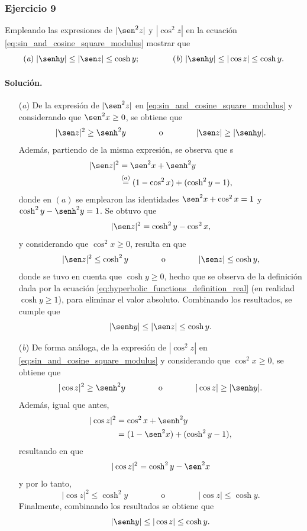 \documentclass[a4paper]{report}
\begin{document}
\subsubsection{Ejercicio 9}

Empleando las expresiones de \(|\sen^2z|\) y \(|\cos^2z|\) en la ecuación \ref{eq:sin_and_cosine_square_modulus} mostrar que 
\[
 (\textit{a})\;|\senh y|\leq|\sen z|\leq\cosh y;\qquad\qquad (\textit{b})\;|\senh y|\leq|\cos z|\leq\cosh y.
\]

\paragraph{Solución.} 
\begin{enumerate}
 \item[(\textit{a})] De la expresión de \(|\sen^2z|\) en \ref{eq:sin_and_cosine_square_modulus} y considerando que \(\sen^2x\geq 0\), se obtiene que 
 \[
  |\sen z|^2\geq\senh^2y
  \qquad\qquad\textrm{o}\qquad\qquad
  |\sen z|\geq|\senh y|.
 \]
 Además, partiendo de la misma expresión, se observa que s 
 \begin{align*}
  |\sen z|^2&=\sen^2x+\senh^2y\\
   &\overset{(a)}{=}(1-\cos^2x)+(\cosh^2y-1),
 \end{align*}
 donde en \((a)\) se emplearon las identidades \(\sen^2x+\cos^2x=1\) y \(\cosh^2y-\senh^2y=1\). Se obtuvo que  
 \begin{equation}\label{eq:sin_and_cosine_square_modulus_alt_sin}
  |\sen z|^2=\cosh^2y-\cos^2x,  
 \end{equation}
 y considerando que \(\cos^2x\geq0\), resulta en que 
 \[
  |\sen z|^2\leq\cosh^2y
  \qquad\qquad\textrm{o}\qquad\qquad
  |\sen z|\leq\cosh y,
 \]
 donde se tuvo en cuenta que \(\cosh y\geq0\), hecho que se observa de la definición dada por la ecuación \ref{eq:hyperbolic_functions_definition_real} (en realidad \(\cosh y\geq1\)), para eliminar el valor absoluto. Combinando los resultados, se cumple que 
 \[
  |\senh y|\leq|\sen z|\leq\cosh y.
 \]
 \item[(\textit{b})] De forma análoga, de la expresión de \(|\cos^2z|\) en \ref{eq:sin_and_cosine_square_modulus} y considerando que \(\cos^2x\geq 0\), se obtiene que 
 \[
  |\cos z|^2\geq\senh^2y
  \qquad\qquad\textrm{o}\qquad\qquad
  |\cos z|\geq|\senh y|.
 \]
 Además, igual que antes,
  \begin{align*}
  |\cos z|^2&=\cos^2x+\senh^2y\\
   &=(1-\sen^2x)+(\cosh^2y-1),
 \end{align*}
 resultando en que 
 \begin{equation}\label{eq:sin_and_cosine_square_modulus_alt_cos}
  |\cos z|^2=\cosh^2y-\sen^2x  
 \end{equation}
 y por lo tanto,
 \[
  |\cos z|^2\leq\cosh^2y
  \qquad\qquad\textrm{o}\qquad\qquad
  |\cos z|\leq\cosh y.
 \]
 Finalmente, combinando los resultados se obtiene que 
 \[
  |\senh y|\leq|\cos z|\leq\cosh y.
 \] 
\end{enumerate} 
\end{document}
